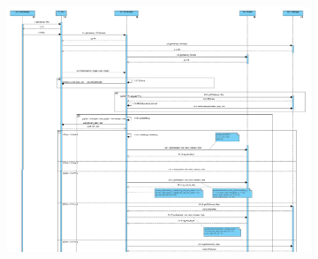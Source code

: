 \documentclass[11pt]{article}
\begin{document}
\begin{figure}[!h]
\vspace*{-4cm}

\centering
	\begin{subfigure}{600px}
	\hspace*{-4.3cm}
	\includegraphics[width=600px, height=789px]{SQD_VisibleRendering.png}
	\end{subfigure}
\end{figure}
\end{document}
